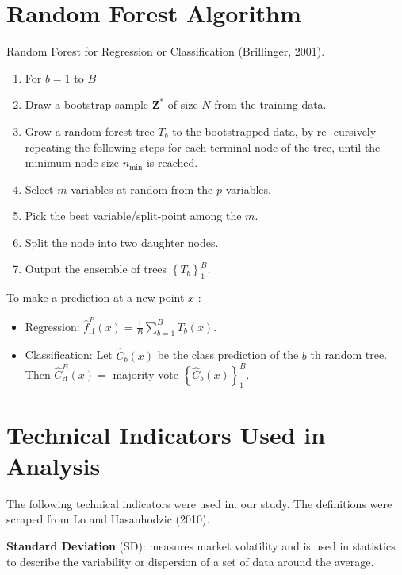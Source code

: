 


\label{} %

\section{Random Forest Algorithm}

Random Forest for Regression or Classification (Brillinger, 2001).

\begin{enumerate}
\item For $b=1$ to $B$
	\item Draw a bootstrap sample $\mathbf{Z}^{*}$ of size $N$ from the training data.
	\item Grow a random-forest tree $T_{b}$ to the bootstrapped data, by re- cursively repeating the following steps for each terminal node of the tree, until the minimum node size $n_{\min }$ is reached.
		\item Select $m$ variables at random from the $p$ variables.
		\item Pick the best variable/split-point among the $m$.
		\item Split the node into two daughter nodes.

\item Output the ensemble of trees $\left\{T_{b}\right\}_{1}^{B}$.
\end{enumerate}

To make a prediction at a new point $x$ :
\begin{itemize}
\item Regression: $\hat{f}_{\mathrm{rf}}^{B}(x)=\frac{1}{B} \sum_{b=1}^{B} T_{b}(x)$.\\
\item Classification: Let $\hat{C}_{b}(x)$ be the class prediction of the $b$ th random tree. Then $\hat{C}_{\mathrm{rf}}^{B}(x)=$ majority vote $\left\{\hat{C}_{b}(x)\right\}_{1}^{B}$.
\end{itemize}

\section{Technical Indicators Used in Analysis}

The following technical indicators were used in. our study. The definitions were scraped from Lo and Hasanhodzic (2010).

\textbf{Standard Deviation} (SD): measures market volatility and is used in statistics to describe the variability or dispersion of a set of data around the average.



